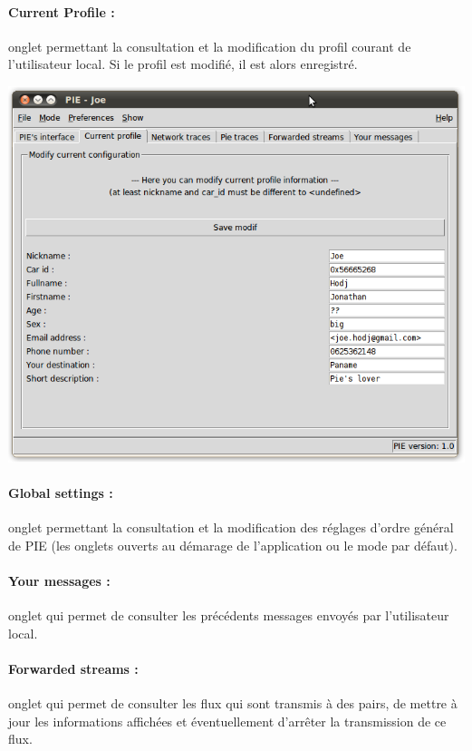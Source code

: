 \clearpage


\paragraph{Current Profile :}
onglet permettant la consultation et la modification du profil
courant de l'utilisateur local. Si le profil est modifié, il est alors enregistré.

\begin{center}
    \includegraphics[scale=0.5]{img/profile.png}
\end{center}


\paragraph{Global settings :}
onglet permettant la consultation et la modification des réglages 
d'ordre général de PIE (les onglets ouverts au démarage de l'application ou le mode par défaut).


\paragraph{Your messages :}
onglet qui permet de consulter les précédents messages envoyés par l'utilisateur local.

\clearpage


\paragraph{Forwarded streams :}
onglet qui permet de consulter les flux qui sont transmis à des pairs, de mettre à jour 
les informations affichées et éventuellement d'arrêter la transmission de ce flux.

